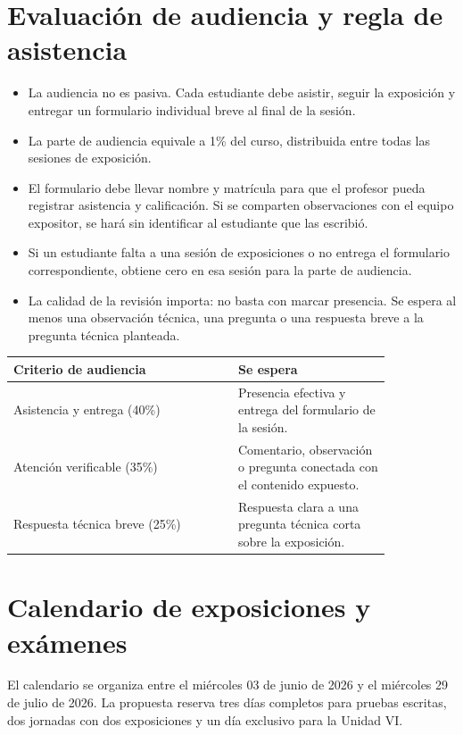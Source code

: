 \documentclass[11pt]{article}
\begin{document}
\section{Evaluación de audiencia y regla de asistencia}
\begin{itemize}
\item La audiencia no es pasiva. Cada estudiante debe asistir, seguir la exposición y entregar un formulario individual breve al final de la sesión.
\item La parte de audiencia equivale a 1\% del curso, distribuida entre todas las sesiones de exposición.
\item El formulario debe llevar nombre y matrícula para que el profesor pueda registrar asistencia y calificación. Si se comparten observaciones con el equipo expositor, se hará sin identificar al estudiante que las escribió.
\item Si un estudiante falta a una sesión de exposiciones o no entrega el formulario correspondiente, obtiene cero en esa sesión para la parte de audiencia.
\item La calidad de la revisión importa: no basta con marcar presencia. Se espera al menos una observación técnica, una pregunta o una respuesta breve a la pregunta técnica planteada.
\end{itemize}

\begin{center}
\begin{tabular}{p{0.50\linewidth} p{0.34\linewidth}}
\toprule
\textbf{Criterio de audiencia} & \textbf{Se espera} \\
\midrule
Asistencia y entrega (40\%) & Presencia efectiva y entrega del formulario de la sesión. \\
Atención verificable (35\%) & Comentario, observación o pregunta conectada con el contenido expuesto. \\
Respuesta técnica breve (25\%) & Respuesta clara a una pregunta técnica corta sobre la exposición. \\
\bottomrule
\end{tabular}
\end{center}

\section{Calendario de exposiciones y exámenes}
\begin{infobox}
El calendario se organiza entre el miércoles 03 de junio de 2026 y el miércoles 29 de julio de 2026. La propuesta reserva tres días completos para pruebas escritas, dos jornadas con dos exposiciones y un día exclusivo para la Unidad VI.
\end{infobox}
\end{document}
